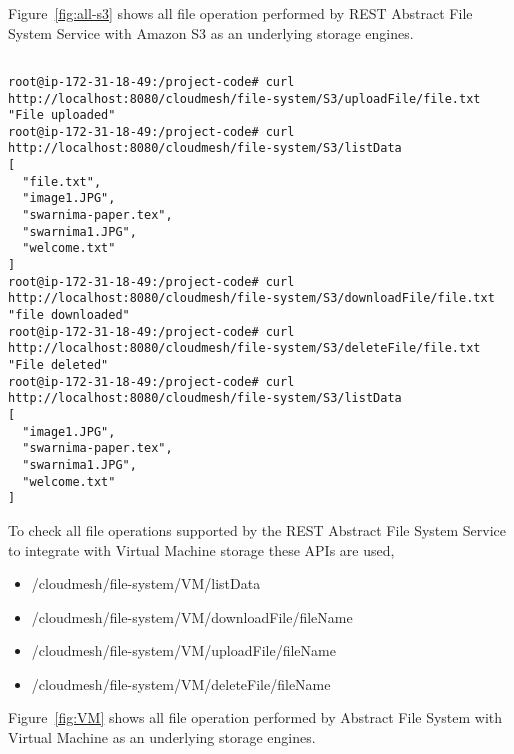 Figure~\ref{fig:all-s3} shows all file operation performed by REST
Abstract File System Service with Amazon S3 as an underlying storage
engines.

\begin{figure*}[!ht]
\begin{footnotesize}
\begin{verbatim}

root@ip-172-31-18-49:/project-code# curl 
http://localhost:8080/cloudmesh/file-system/S3/uploadFile/file.txt
"File uploaded"
root@ip-172-31-18-49:/project-code# curl 
http://localhost:8080/cloudmesh/file-system/S3/listData
[
  "file.txt",
  "image1.JPG",
  "swarnima-paper.tex",
  "swarnima1.JPG",
  "welcome.txt"
]
root@ip-172-31-18-49:/project-code# curl 
http://localhost:8080/cloudmesh/file-system/S3/downloadFile/file.txt
"file downloaded"
root@ip-172-31-18-49:/project-code# curl 
http://localhost:8080/cloudmesh/file-system/S3/deleteFile/file.txt
"File deleted"
root@ip-172-31-18-49:/project-code# curl 
http://localhost:8080/cloudmesh/file-system/S3/listData
[
  "image1.JPG",
  "swarnima-paper.tex",
  "swarnima1.JPG",
  "welcome.txt"
]

\end{verbatim}
\end{footnotesize}
\caption{all S3 operations}\label{fig:all-s3}
\end{figure*}


To check all file operations supported by the REST Abstract File
System Service to integrate with Virtual Machine storage these APIs
are used,

\begin{itemize}
    \item /cloudmesh/file-system/VM/listData
    \item /cloudmesh/file-system/VM/downloadFile/{fileName}
    \item /cloudmesh/file-system/VM/uploadFile/{fileName}
    \item /cloudmesh/file-system/VM/deleteFile/{fileName}
\end{itemize}

Figure~\ref{fig:VM} shows all file operation performed by Abstract 
File System with Virtual Machine as an underlying storage engines. 

